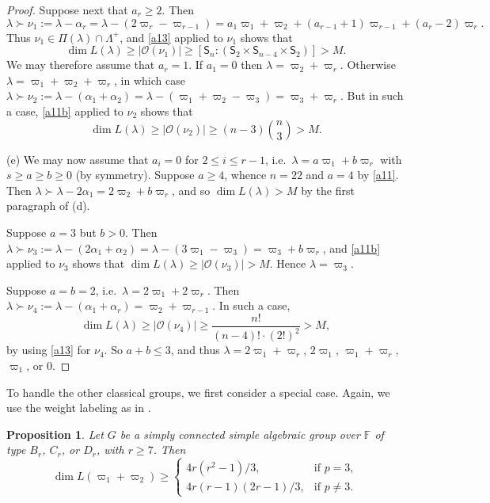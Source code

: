 \documentclass[11pt]{amsart}
\theoremstyle{plain}
\newtheorem{prop}[thm]{Proposition}
\theoremstyle{definition}
\numberwithin{thm}{section}
\numberwithin{equation}{thm}
\newcommand{\al}{\alpha}
\newcommand{\om}{\varpi}
\newcommand{\sO}{{\mathcal O}}
\newcommand{\F}{{\mathbb F}}
\newcommand{\0}{\emptyset}
\newcommand{\SBS}{\mathsf{S}}
\newcommand{\LP}{{\Lambda^{+}}}
\newcommand{\lam}{\lambda}
\begin{document}
\begin{proof}
Suppose next that $a_r \geq 2$. Then 
$$\lam \succ \nu_1:= \lam-\al_r = \lam-(2\om_r-\om_{r-1}) = a_1\om_1+\om_2 +(a_{r-1}+1)\om_{r-1}+(a_r-2)\om_r.$$
Thus $\nu_1 \in \Pi(\lam) \cap \LP$, and \eqref{a13} applied to $\nu_1$ shows that 
$$\dim L(\lam) \geq |\sO(\nu_1)| \geq [\SBS_n:(\SBS_2 \times \SBS_{n-4} \times \SBS_2)] > M.$$
We may therefore assume that $a_r = 1$. If $a_1=0$ then $\lam = \om_2+\om_r$. Otherwise $\lam = \om_1+\om_2+\om_r$, in which
case $\lam \succ \nu_2:= \lam-(\al_1+\al_2) = \lam-(\om_1+\om_2-\om_3) = \om_3+\om_r$. But in such a case,
\eqref{a11b} applied to $\nu_2$ shows that
$$\dim L(\lam) \geq |\sO(\nu_2)| \geq (n-3)\binom{n}{3} > M.$$ 

\smallskip
(e) We may now assume that $a_i = 0$ for $2 \leq i \leq r-1$, i.e.\ $\lam = a\om_1+b\om_r$ with $s \geq a \geq b \geq 0$ (by symmetry).
Suppose $a \geq 4$, whence $n=22$ and $a=4$ by \eqref{a11}. Then $\lam \succ \lam-2\al_1 = 2\om_2+b\om_r$, and 
so $\dim L(\lam) > M$ by the first paragraph of (d).

Suppose $a=3$ but $b > 0$. Then $\lam \succ \nu_3:= \lam-(2\al_1+\al_2) = \lam-(3\om_1-\om_3) = \om_3+b\om_r$, and \eqref{a11b}
applied to $\nu_3$ shows that $\dim L(\lam) \geq |\sO(\nu_3)| > M$. Hence $\lam = \om_3$.

Suppose $a=b=2$, i.e.\ $\lam = 2\om_1+2\om_r$. Then $\lam \succ \nu_4:= \lam-(\al_1+\al_r) = \om_2+\om_{r-1}$. In such a case,
$$\dim L(\lam) \geq |\sO(\nu_4)| \geq \dfrac{n!}{(n-4)! \cdot (2!)^2} > M,$$ 
by using \eqref{a13} for $\nu_4$. So $a+b \leq 3$, and thus
$\lam = 2\om_1+\om_r$, $2\om_1$, $\om_1+\om_r$, $\om_1$, or $0$.
\end{proof}

To handle the other classical groups, we first consider a special case. Again, we use the weight labeling as in \cite{OV}.

\begin{prop}\label{bcd}
Let $G$ be a simply connected simple algebraic group over $\F$ of type $B_r$, $C_r$, or $D_r$, with $r \geq 7$. 
Then 
$$\dim L(\om_1+\om_2) \geq \left\{ \begin{array}{ll}4r(r^2-1)/3, & \mbox{if }p=3,\\ 
  4r(r-1)(2r-1)/3,& \mbox{if }p \neq 3.\end{array}\right.$$
\end{prop} 
\end{document}
